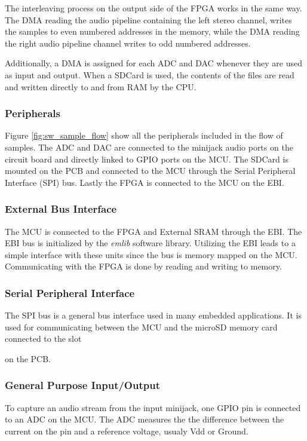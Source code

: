 The interleaving process on the output side of the FPGA works in the same way.
The DMA reading the audio pipeline containing the left stereo channel, writes
the samples to even numbered addresses in the memory, while the DMA reading the
right audio pipeline channel writes to odd numbered addresses.

Additionally, a DMA is assigned for each ADC and DAC whenever they are used as
input and output. When a SDCard is used, the contents of the files are read and
written directly to and from RAM by the CPU.

\subsubsection{Peripherals}



Figure \ref{fig:sw_sample_flow} show all the peripherals included in the flow of samples.
The ADC and DAC are connected to the minijack audio ports on the circuit board and directly
linked to GPIO ports on the MCU. The SDCard
is mounted on the PCB and connected to the MCU through the Serial Peripheral Interface (SPI)
bus. Lastly the FPGA is connected to the MCU on the EBI.

\subsubsection{External Bus Interface}
The MCU is connected to the FPGA and External SRAM through the EBI. The EBI bus
is initialized by the {\it emlib} software library. Utilizing
the EBI leads to a simple interface with these units since the bus is memory
mapped on the MCU. Communicating with the FPGA is done by reading and writing to memory.

\subsubsection{Serial Peripheral Interface}
The SPI bus is a general bus interface used in many embedded applications. It is used
for communicating between the MCU and the microSD memory card connected to the slot

on the PCB.

\subsubsection{General Purpose Input/Output}
To capture an audio stream from the input minijack, one GPIO pin is connected to an
ADC on the MCU. The ADC measures the the difference between the current on the pin 
and a reference voltage, usualy Vdd or Ground. 


